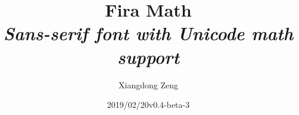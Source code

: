 \documentclass{article}
\title{\bfseries\huge Fira Math\\
  \itshape\Large Sans-serif font with Unicode math support}
\author{Xiangdong Zeng}
\date{2019/02/20\quad v0.4-beta-3}
\begin{document}
\maketitle
\printtable
\end{document}
